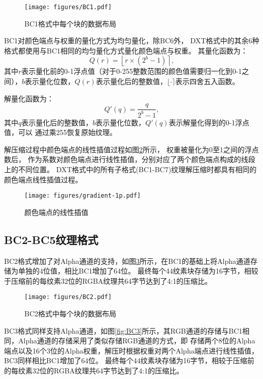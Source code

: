 \begin{figure}[htbp]
    \centering
    \texttt{[image: figures/BC1.pdf]}
    \caption{BC1格式中每个块的数据布局\cite{BC1-5}}
    \label{fig:BC1}
\end{figure}

BC1对颜色端点与权重的量化方式为均匀量化，除BC6外，
DXT格式中的其余6种格式都使用与BC1相同的均匀量化方式量化颜色端点与权重。
其量化函数为：
\begin{equation}\label{eqn-6}
    Q(r)=\left \lfloor r \times (2^{b}-1) \right \rceil,
\end{equation}
其中$r$表示量化前的0-1浮点值（对于0-255整数范围的颜色值需要归一化到0-1之间），$b$表示量化位数，$Q(r)$表示量化后的整数值，$\lfloor \cdot \rceil$表示四舍五入函数。

解量化函数为：
\begin{equation}\label{eqn-6}
    Q'(q)=\frac{q}{2^{b}-1},
\end{equation}
其中$q$表示量化后的整数值，$b$表示量化位数，$Q'(q)$表示解量化得到的0-1浮点值，可以
通过乘255恢复原始纹理。

解压缩过程中颜色端点的线性插值过程如图\ref{fig:LinearInterpolate}所示，
权重被量化为0至1之间的浮点数后，
作为系数对颜色端点进行线性插值，分别对应了两个颜色端点构成的线段上的不同位置。
DXT格式中的所有子格式(BC1-BC7)纹理解压缩时都具有相同的颜色端点线性插值过程。

\begin{figure}[htbp]
    \centering
    \texttt{[image: figures/gradient-1p.pdf]}
    \caption{颜色端点的线性插值\cite{ASTC}}
    \label{fig:LinearInterpolate}
\end{figure}

\subsection{BC2-BC5纹理格式}
BC2格式增加了对Alpha通道的支持，如图\ref{fig:BC2}所示，在BC1的基础上将Alpha通道存储为单独的4位值，相比BC1增加了64位。
最终每个4\times4纹素块存储为16字节，相较于压缩前的每纹素32位的RGBA纹理共64字节达到了4:1的压缩比。

\begin{figure}[htbp]
    \centering
    \texttt{[image: figures/BC2.pdf]}
    \caption{BC2格式中每个块的数据布局\cite{BC1-5}}
    \label{fig:BC2}
\end{figure}    

BC3格式同样支持Alpha通道，如图\ref{fig:BC3}所示，其RGB通道的存储与BC1相同，Alpha通道的存储采用了类似存储RGB通道的方式，即
存储两个8位的Alpha 端点以及16个3位的Alpha权重，解压时根据权重对两个Alpha端点进行线性插值，BC3同样相比BC1增加了64位。
最终每个4\times4纹素块存储为16字节，相较于压缩前的每纹素32位的RGBA纹理共64字节达到了4:1的压缩比。

